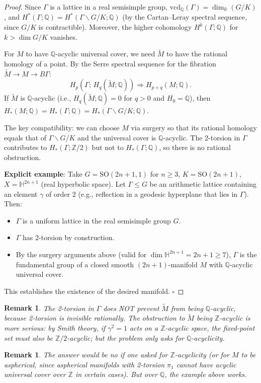 \documentclass[12pt]{article}
\newtheorem{remark}[theorem]{Remark}
\begin{document}
\begin{proof}
Since $\Gamma$ is a lattice in a real semisimple group, $\mathrm{vcd}_\mathbb{Q}(\Gamma) = \dim_\mathbb{R}(G/K)$, and $H^*(\Gamma;\mathbb{Q}) = H^*(\Gamma\backslash G/K;\mathbb{Q})$ (by the Cartan--Leray spectral sequence, since $G/K$ is contractible).  Moreover, the higher cohomology $H^k(\Gamma;\mathbb{Q})$ for $k > \dim G/K$ vanishes.

For $M$ to have $\mathbb{Q}$-acyclic universal cover, we need $\tilde{M}$ to have the rational homology of a point.  By the Serre spectral sequence for the fibration $\tilde{M} \to M \to B\Gamma$:
\[
  H_p(\Gamma;\,H_q(\tilde{M};\mathbb{Q})) \Rightarrow H_{p+q}(M;\mathbb{Q}).
\]
If $\tilde{M}$ is $\mathbb{Q}$-acyclic (i.e., $H_q(\tilde{M};\mathbb{Q}) = 0$ for $q>0$ and $H_0=\mathbb{Q}$), then $H_*(M;\mathbb{Q}) = H_*(\Gamma;\mathbb{Q}) = H_*(\Gamma\backslash G/K;\mathbb{Q})$.

The key compatibility: we can choose $M$ via surgery so that its rational homology equals that of $\Gamma\backslash G/K$ and the universal cover is $\mathbb{Q}$-acyclic.  The 2-torsion in $\Gamma$ contributes to $H_*(\Gamma;\mathbb{Z}/2)$ but not to $H_*(\Gamma;\mathbb{Q})$, so there is no rational obstruction.

\medskip
\noindent\textbf{Explicit example}: Take $G = \mathrm{SO}(2n+1,1)$ for $n \geq 3$, $K = \mathrm{SO}(2n+1)$, $X = \mathbb{H}^{2n+1}$ (real hyperbolic space).  Let $\Gamma \leq G$ be an arithmetic lattice containing an element $\gamma$ of order 2 (e.g., reflection in a geodesic hyperplane that lies in $\Gamma$).  Then:
\begin{itemize}
  \item $\Gamma$ is a uniform lattice in the real semisimple group $G$.
  \item $\Gamma$ has 2-torsion by construction.
  \item By the surgery arguments above (valid for $\dim\mathbb{H}^{2n+1} = 2n+1 \geq 7$), $\Gamma$ is the fundamental group of a closed smooth $(2n+1)$-manifold $M$ with $\mathbb{Q}$-acyclic universal cover.
\end{itemize}
This establishes the existence of the desired manifold. \hfill$\square$
\end{proof}

\begin{remark}
The 2-torsion in $\Gamma$ does NOT prevent $\tilde{M}$ from being $\mathbb{Q}$-acyclic, because 2-torsion is invisible rationally.  The obstruction to $\tilde{M}$ being $\mathbb{Z}$-acyclic is more serious: by Smith theory, if $\gamma^2=1$ acts on a $\mathbb{Z}$-acyclic space, the fixed-point set must also be $\mathbb{Z}/2$-acyclic; but the problem only asks for $\mathbb{Q}$-acyclicity.
\end{remark}

\begin{remark}
The answer would be \emph{no} if one asked for $\mathbb{Z}$-acyclicity (or for $M$ to be aspherical, since aspherical manifolds with 2-torsion $\pi_1$ cannot have acyclic universal cover over $\mathbb{Z}$ in certain cases).  But over $\mathbb{Q}$, the example above works.
\end{remark}
\end{document}
